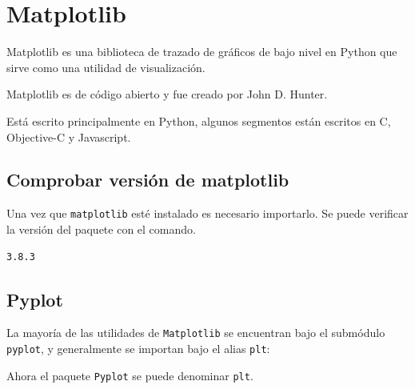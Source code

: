 \chapter{Matplotlib}

Matplotlib es una biblioteca de trazado de gráficos de bajo nivel en
Python que sirve como una utilidad de visualización.

Matplotlib es de código abierto y fue creado por John D. Hunter.

Está escrito principalmente en Python, algunos segmentos están escritos
en C, Objective-C y Javascript.

\section{Comprobar versión de matplotlib}

Una vez que \texttt{matplotlib} esté instalado es necesario importarlo.
Se puede verificar la versión del paquete con el comando.

\begin{Shaded}
\begin{Highlighting}[]
\end{Highlighting}
\end{Shaded}

\begin{verbatim}
3.8.3
\end{verbatim}

\section{Pyplot}

La mayoría de las utilidades de \texttt{Matplotlib} se encuentran bajo
el submódulo \texttt{pyplot}, y generalmente se importan bajo el alias
\texttt{plt}:

\begin{Shaded}
\begin{Highlighting}[]
\end{Highlighting}
\end{Shaded}

Ahora el paquete \texttt{Pyplot} se puede denominar \texttt{plt}.\\

